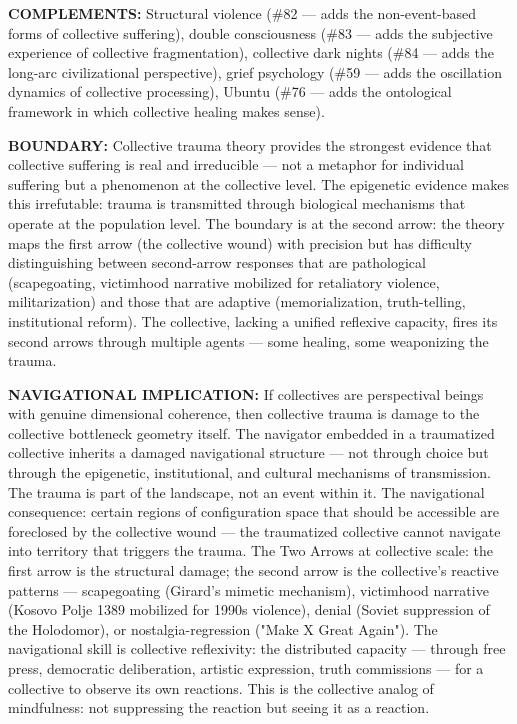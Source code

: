 \textbf{COMPLEMENTS:} Structural violence (\#82 — adds the non-event-based forms of collective suffering), double consciousness (\#83 — adds the subjective experience of collective fragmentation), collective dark nights (\#84 — adds the long-arc civilizational perspective), grief psychology (\#59 — adds the oscillation dynamics of collective processing), Ubuntu (\#76 — adds the ontological framework in which collective healing makes sense).


\textbf{BOUNDARY:} Collective trauma theory provides the strongest evidence that collective suffering is real and irreducible — not a metaphor for individual suffering but a phenomenon at the collective level. The epigenetic evidence makes this irrefutable: trauma is transmitted through biological mechanisms that operate at the population level. The boundary is at the second arrow: the theory maps the first arrow (the collective wound) with precision but has difficulty distinguishing between second-arrow responses that are pathological (scapegoating, victimhood narrative mobilized for retaliatory violence, militarization) and those that are adaptive (memorialization, truth-telling, institutional reform). The collective, lacking a unified reflexive capacity, fires its second arrows through multiple agents — some healing, some weaponizing the trauma.


\textbf{NAVIGATIONAL IMPLICATION:} If collectives are perspectival beings with genuine dimensional coherence, then collective trauma is damage to the collective bottleneck geometry itself. The navigator embedded in a traumatized collective inherits a damaged navigational structure — not through choice but through the epigenetic, institutional, and cultural mechanisms of transmission. The trauma is part of the landscape, not an event within it. The navigational consequence: certain regions of configuration space that should be accessible are foreclosed by the collective wound — the traumatized collective cannot navigate into territory that triggers the trauma. The Two Arrows at collective scale: the first arrow is the structural damage; the second arrow is the collective's reactive patterns — scapegoating (Girard's mimetic mechanism), victimhood narrative (Kosovo Polje 1389 mobilized for 1990s violence), denial (Soviet suppression of the Holodomor), or nostalgia-regression ("Make X Great Again"). The navigational skill is collective reflexivity: the distributed capacity — through free press, democratic deliberation, artistic expression, truth commissions — for a collective to observe its own reactions. This is the collective analog of mindfulness: not suppressing the reaction but seeing it as a reaction.


